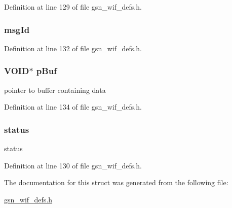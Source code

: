Definition at line 129 of file gsn\_\-wif\_\-defs.h.

\hypertarget{a00325_ac62e60ec11953cdf626998842aae59ae}{
\subsubsection[{msgId}]{ {\bf msgId}}}
\label{a00325_ac62e60ec11953cdf626998842aae59ae}


Definition at line 132 of file gsn\_\-wif\_\-defs.h.

\hypertarget{a00325_ae73880d96d570d584a107c2b4ef84584}{
\subsubsection[{pBuf}]{\setlength{\rightskip}{0pt plus 5cm}VOID$\ast$ {\bf pBuf}}}
\label{a00325_ae73880d96d570d584a107c2b4ef84584}
pointer to buffer containing data 

Definition at line 134 of file gsn\_\-wif\_\-defs.h.

\hypertarget{a00325_ae425f6f53cf8bd844de7aefd5a15798a}{
\subsubsection[{status}]{ {\bf status}}}
\label{a00325_ae425f6f53cf8bd844de7aefd5a15798a}
status 

Definition at line 130 of file gsn\_\-wif\_\-defs.h.



The documentation for this struct was generated from the following file:\begin{DoxyCompactItemize}
\item 
\hyperlink{a00610}{gsn\_\-wif\_\-defs.h}\end{DoxyCompactItemize}
